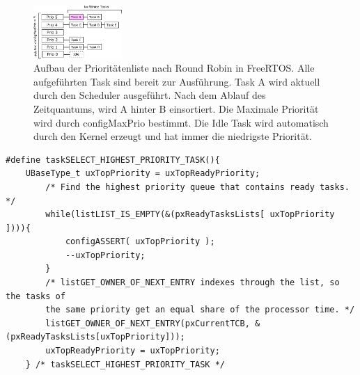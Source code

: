 \begin{figure}[ht!]
	\centering
		\includegraphics[width=0.3\textwidth]{Pictures/Scheduling/PrioList1.png}
	\caption{Aufbau der Prioritätenliste nach Round Robin in FreeRTOS. Alle aufgeführten Task sind bereit zur Ausführung. Task A wird aktuell durch den Scheduler ausgeführt. Nach dem Ablauf des Zeitquantums, wird A hinter B einsortiert. Die Maximale Priorität wird durch configMaxPrio bestimmt. Die Idle Task wird automatisch durch den Kernel erzeugt und hat immer die niedrigste Priorität. }
	\label{fig:PrioList1}
\end{figure}
\begin{lstlisting}[caption={FreeRTOS Source zur Priroty Task Selection aus Task.c. Alle lauffähigen Task werden in einem Array vewaltet pxReadyTaskLists. Die Listen verwalten sich durch Referenz-Pointer in den TCBs der einzelnen Tasks}, linewidth=8cm,captionpos=b, label=lst:nextTask, float=hbt]
#define taskSELECT_HIGHEST_PRIORITY_TASK(){																									
	UBaseType_t uxTopPriority = uxTopReadyPriority;														
		/* Find the highest priority queue that contains ready tasks. */								
		while(listLIST_IS_EMPTY(&(pxReadyTasksLists[ uxTopPriority ]))){																								
			configASSERT( uxTopPriority );																
			--uxTopPriority;																			
		}																								
		/* listGET_OWNER_OF_NEXT_ENTRY indexes through the list, so the tasks of						
		the	same priority get an equal share of the processor time. */									
		listGET_OWNER_OF_NEXT_ENTRY(pxCurrentTCB, &(pxReadyTasksLists[uxTopPriority]));			
		uxTopReadyPriority = uxTopPriority;																
	} /* taskSELECT_HIGHEST_PRIORITY_TASK */
\end{lstlisting}

